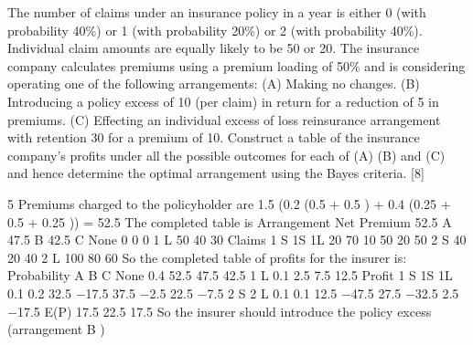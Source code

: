\documentclass[a4paper,12pt]{article}
\begin{document}
The number of claims under an insurance policy in a year is either 0 (with probability
40\%) or 1 (with probability 20\%) or 2 (with probability 40\%). Individual claim
amounts are equally likely to be 50 or 20. The insurance company calculates
premiums using a premium loading of 50\% and is considering operating one of the
following arrangements:
(A) Making no changes.
(B) Introducing a policy excess of 10 (per claim) in return for a reduction of 5 in
premiums.
(C) Effecting an individual excess of loss reinsurance arrangement with retention
30 for a premium of 10.
Construct a table of the insurance company’s profits under all the possible outcomes
for each of (A) (B) and (C) and hence determine the optimal arrangement using the
Bayes criteria.
[8]

\newpage

5
Premiums charged to the policyholder are
1.5 \times  (0.2 \times  (0.5  + 0.5 ) + 0.4 \times  (0.25  + 0.5  + 0.25 )) = 52.5
The completed table is
Arrangement Net Premium
52.5
A
47.5
B
42.5
C
None
0
0
0
1 L
50
40
30
Claims
1 S 1S 1L
20
70
10
50
20
50
2 S
40
20
40
2 L
100
80
60
So the completed table of profits for the insurer is:
Probability
A
B
C
None
0.4
52.5
47.5
42.5
1 L
0.1
2.5
7.5
12.5
Profit
1 S
1S 1L
0.1
0.2
32.5 −17.5
37.5 −2.5
22.5 −7.5
2 S
2 L
0.1
0.1
12.5 −47.5
27.5 −32.5
2.5 −17.5
E(P)
17.5
22.5
17.5
So the insurer should introduce the policy excess (arrangement B )

\end{document}
